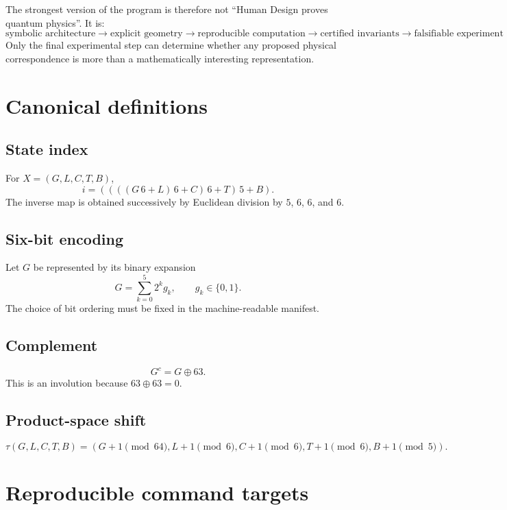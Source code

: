 \documentclass[11pt,a4paper]{article}
\numberwithin{equation}{section}
\begin{document}
The strongest version of the program is therefore not ``Human Design proves quantum physics''. It is:
\begin{equation}
\boxed{
\text{symbolic architecture}
\rightarrow
\text{explicit geometry}
\rightarrow
\text{reproducible computation}
\rightarrow
\text{certified invariants}
\rightarrow
\text{falsifiable experiment}
}
\end{equation}
Only the final experimental step can determine whether any proposed physical correspondence is more than a mathematically interesting representation.

\appendix
\section{Canonical definitions}
\label{app:canonical}

\subsection{State index}
For $X=(G,L,C,T,B)$,
\[
i=((((G\,6+L)\,6+C)\,6+T)\,5+B).
\]
The inverse map is obtained successively by Euclidean division by $5$, $6$, $6$, and $6$.

\subsection{Six-bit encoding}
Let $G$ be represented by its binary expansion
\[
G=\sum_{k=0}^{5}2^k g_k,
\qquad g_k\in\{0,1\}.
\]
The choice of bit ordering must be fixed in the machine-readable manifest.

\subsection{Complement}
\[
G^c=G\oplus63.
\]
This is an involution because $63\oplus63=0$.

\subsection{Product-space shift}
\[
\tau(G,L,C,T,B)=(G+1\!\!\pmod{64},L+1\!\!\pmod6,C+1\!\!\pmod6,T+1\!\!\pmod6,B+1\!\!\pmod5).
\]

\section{Reproducible command targets}
\label{app:commands}
\end{document}
